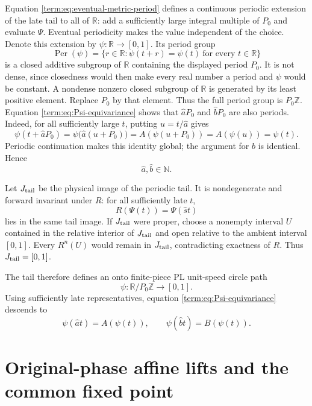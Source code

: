 \documentclass[11pt]{article}
\theoremstyle{definition}
\theoremstyle{remark}
\newcommand{\I}{[0,1]}
\begin{document}
Equation \eqref{term:eq:eventual-metric-period} defines a continuous periodic
extension of the late tail to all of \(\mathbb R\): add a sufficiently large
integral multiple of \(P_0\) and evaluate \(\Psi\).  Eventual periodicity
makes the value independent of the choice.  Denote this extension by
\(\psi:\mathbb R\to\I\).  Its period group
\[
 \operatorname{Per}(\psi)
 =\{r\in\mathbb R:\psi(t+r)=\psi(t)\ \text{for every }t\in\mathbb R\}
\]
is a closed additive subgroup of \(\mathbb R\) containing the displayed
period \(P_0\).  It is not dense, since closedness would then make every real
number a period and \(\psi\) would be constant.  A nondense nonzero closed
subgroup of \(\mathbb R\) is generated by its least positive element.
Replace \(P_0\) by that element.  Thus the full period group is
\(P_0\mathbb Z\).
Equation \eqref{term:eq:Psi-equivariance} shows that
\(\widehat aP_0\) and \(\widehat bP_0\) are also periods.  Indeed, for all
sufficiently large \(t\), putting \(u=t/\widehat a\) gives
\[
 \psi(t+\widehat aP_0)
 =\psi\bigl(\widehat a(u+P_0)\bigr)
 =A(\psi(u+P_0))
 =A(\psi(u))
 =\psi(t).
\]
Periodic continuation makes this identity global; the argument for
\(\widehat b\) is identical.  Hence
\begin{equation}\label{term:eq:integer-slopes}
 \widehat a,\widehat b\in\mathbb N.
\end{equation}

Let \(J_{\rm tail}\) be the physical image of the periodic tail.  It is
nondegenerate and forward invariant under \(R\): for all sufficiently late
\(t\),
\[
 R(\Psi(t))=\Psi(\widehat s t)
\]
lies in the same tail image.  If \(J_{\rm tail}\) were proper, choose a
nonempty interval \(U\) contained in the relative interior of
\(J_{\rm tail}\) and open relative to the ambient interval \(\I\).  Every
\(R^n(U)\) would remain in \(J_{\rm tail}\), contradicting exactness of
\(R\).  Thus \(J_{\rm tail}=\I\).

The tail therefore defines an onto finite-piece PL unit-speed circle path
\begin{equation}\label{term:eq:psi-circle}
 \psi\colon\mathbb R/P_0\mathbb Z\longrightarrow\I.
\end{equation}
Using sufficiently late representatives, equation
\eqref{term:eq:Psi-equivariance} descends to
\begin{equation}\label{term:eq:psi-returns}
 \psi(\widehat a t)=A(\psi(t)),\qquad
 \psi(\widehat b t)=B(\psi(t)).
\end{equation}

\section{Original-phase affine lifts and the common fixed point}
\end{document}
